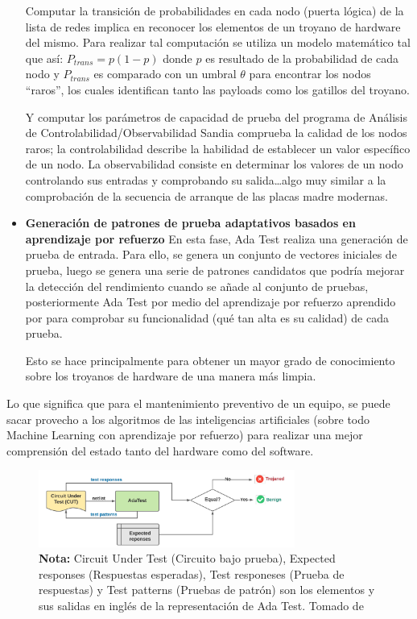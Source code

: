 \begin{itemize}
    Computar la transición de probabilidades en cada nodo (puerta lógica) de la
    lista de redes implica en reconocer los elementos de un troyano de hardware
    del mismo. Para realizar tal computación se utiliza un modelo matemático tal
    que así: $ P_{trans} = p(1-p) $ donde $ p $ es resultado de la probabilidad
    de cada nodo y $ P_{trans} $ es comparado con un umbral $ \theta $ para
    encontrar los nodos ``raros'', los cuales identifican tanto las payloads
    como los gatillos del troyano.

    Y computar los parámetros de capacidad de prueba del programa de Análisis de
    Controlabilidad/Observabilidad Sandia comprueba la calidad de los nodos
    raros; la controlabilidad describe la habilidad de establecer un valor
    específico de un nodo. La observabilidad consiste en determinar los valores
    de un nodo controlando sus entradas y comprobando su salida\dots algo muy
    similar a la comprobación de la secuencia de arranque de las placas madre
    modernas.
  \item \textbf{
      Generación de patrones de prueba adaptativos basados en aprendizaje por
      refuerzo}
    En esta fase, Ada Test realiza una generación de prueba de entrada. Para
    ello, se genera un conjunto de vectores iniciales de prueba, luego se
    genera una serie de patrones candidatos que podría mejorar la detección del
    rendimiento cuando se añade al conjunto de pruebas, posteriormente Ada Test
    por medio del aprendizaje por refuerzo aprendido por \textcite{Janiesch2021}
    para comprobar su funcionalidad (qué tan alta es su calidad) de cada prueba.

    Esto se hace principalmente para obtener un mayor grado de conocimiento
    sobre los troyanos de hardware de una manera más limpia.
\end{itemize}

Lo que significa que para el mantenimiento preventivo de un equipo, se puede
sacar provecho a los algoritmos de las inteligencias artificiales (sobre todo
Machine Learning con aprendizaje por refuerzo) para realizar una mejor
comprensión del estado tanto del hardware como del software.

\begin{figure}[htb]
  \centering
  \includegraphics[width=0.75\textwidth]{./pictures/adatest.png}
  \caption{
    \textbf{Nota:} Circuit Under Test (Circuito bajo prueba), Expected responses
    (Respuestas esperadas), Test responeses (Prueba de respuestas) y Test
    patterns (Pruebas de patrón) son los elementos y sus salidas en inglés de
    la representación de Ada Test. Tomado de \cite{Chen2023}}
  \label{fig:adatest}
\end{figure} 

